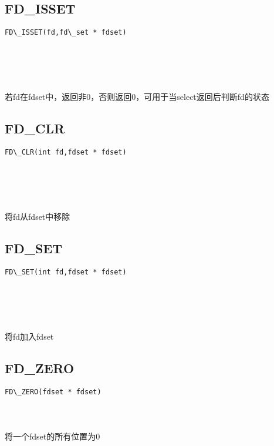 \documentclass[10pt,a4paper]{article}
\begin{document}
\subsection{FD\_ISSET}
\begin{spacing}{2.0}
\lstset{language=C,numbers=none}
\begin{lstlisting}
FD\_ISSET(fd,fd\_set * fdset)
\end{lstlisting}
{\large\color[rgb]{0.2,0.4,0.6}{fd:}} \\
{\large\color[rgb]{0.2,0.4,0.6}{fdset:}}
\paragraph{ \ \ }若fd在fdset中，返回非0，否则返回0，可用于当select返回后判断fd的状态
\end{spacing}

\subsection{FD\_CLR}
\begin{spacing}{2.0}
\lstset{language=C,numbers=none}
\begin{lstlisting}
FD\_CLR(int fd,fdset * fdset)
\end{lstlisting}
{\large\color[rgb]{0.2,0.4,0.6}{fd:}} \\
{\large\color[rgb]{0.2,0.4,0.6}{fdset:}}
\paragraph{ \ \ }将fd从fdset中移除
\end{spacing}

\subsection{FD\_SET}
\begin{spacing}{2.0}
\lstset{language=C,numbers=none}
\begin{lstlisting}
FD\_SET(int fd,fdset * fdset)
\end{lstlisting}
{\large\color[rgb]{0.2,0.4,0.6}{fd:}} \\
{\large\color[rgb]{0.2,0.4,0.6}{fdset:}}
\paragraph{ \ \ }将fd加入fdset
\end{spacing}

\subsection{FD\_ZERO}
\begin{spacing}{2.0}
\lstset{language=C,numbers=none}
\begin{lstlisting}
FD\_ZERO(fdset * fdset)
\end{lstlisting}
{\large\color[rgb]{0.2,0.4,0.6}{fdset:}}
\paragraph{ \ \ }将一个fdset的所有位置为0
\end{spacing}
\end{document}
